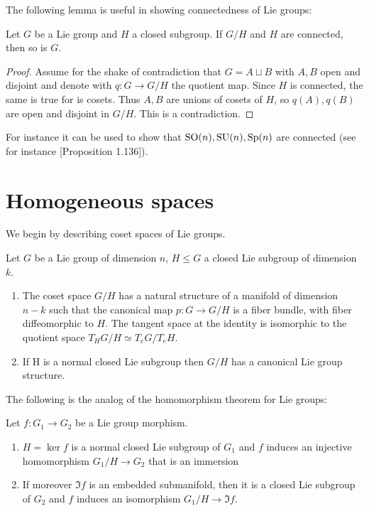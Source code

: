 \documentclass{report}
\begin{document}
The following lemma is useful in showing connectedness of Lie groups:
\begin{lemma}
    Let $G$ be a Lie group and $H$ a closed subgroup.
    If $G/H$ and $H$ are connected, then so is $G$.
\end{lemma}
\begin{proof}
    Assume for the shake of contradiction that $G = A \sqcup B$ with $A, B$ open and disjoint and denote with $q: G \to G/H$ the quotient map.
    Since $H$ is connected, the same is true for is cosets.
    Thus $A,B$ are unions of cosets of $H$, so $q(A), q(B)$ are open and disjoint in $G/H$.
    This is a contradiction.
\end{proof}
For instance it can be used to show that $\operatorname{{\mathrm{SO}}}(n), \operatorname{{\mathrm{SU}}}(n), \mathrm{Sp}(n)$ are connected (see for instance \cite{knapp1996lie}[Proposition 1.136]).
\section{Homogeneous spaces}
We begin by describing coset spaces of Lie groups.
\begin{theorem}
    Let $G$ be a Lie group of dimension $n$, $H \leq G$ a closed Lie subgroup of dimension $k$.
    \begin{enumerate}[label = (\roman*)]
        \item The coset space $G/H$ has a natural structure of a manifold of dimension $n-k$ such that the canonical map $p: G \to G/H$ is a fiber bundle, with fiber diffeomorphic to $H$.
        The tangent space at the identity is isomorphic to the quotient space $T_H G/H \simeq T_eG/T_eH$.
        \item If H is a normal closed Lie subgroup then $G/H$ has a canonical Lie group structure.
    \end{enumerate}
\end{theorem}

The following is the analog of the homomorphism theorem for Lie groups:
\begin{theorem}
    Let $f:G_1 \to G_2$ be a Lie group morphism.
    \begin{enumerate}[label = (\roman*)]
        \item $H = \ker f$ is a normal closed Lie subgroup of $G_1$ and $f$ induces an injective homomorphism $G_1/H \to G_2$ that is an immersion
        \item If moreover $\Im f$ is an embedded submanifold, then it is a closed Lie subgroup of $G_2$ and $f$ induces an isomorphism $G_1/H \to \Im f$.
    \end{enumerate}
\end{theorem}
\end{document}
